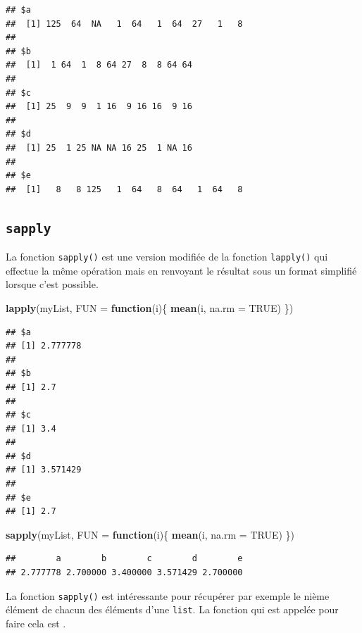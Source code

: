 \documentclass[]{book}
\newenvironment{Shaded}{\begin{snugshade}}{\end{snugshade}}
\newcommand{\ControlFlowTok}[1]{\textcolor[rgb]{0.13,0.29,0.53}{\textbf{#1}}}
\newcommand{\DataTypeTok}[1]{\textcolor[rgb]{0.13,0.29,0.53}{#1}}
\newcommand{\KeywordTok}[1]{\textcolor[rgb]{0.13,0.29,0.53}{\textbf{#1}}}
\newcommand{\NormalTok}[1]{#1}
\newcommand{\OtherTok}[1]{\textcolor[rgb]{0.56,0.35,0.01}{#1}}
\begin{document}
\begin{verbatim}
## $a
##  [1] 125  64  NA   1  64   1  64  27   1   8
## 
## $b
##  [1]  1 64  1  8 64 27  8  8 64 64
## 
## $c
##  [1] 25  9  9  1 16  9 16 16  9 16
## 
## $d
##  [1] 25  1 25 NA NA 16 25  1 NA 16
## 
## $e
##  [1]   8   8 125   1  64   8  64   1  64   8
\end{verbatim}

\hypertarget{l17lapply}{%
\subsection{\texorpdfstring{\texttt{sapply}}{sapply}}\label{l17lapply}}

La fonction \texttt{sapply()} est une version modifiée de la fonction \texttt{lapply()} qui effectue la même opération mais en renvoyant le résultat sous un format simplifié lorsque c'est possible.

\begin{Shaded}
\begin{Highlighting}[]
\KeywordTok{lapply}\NormalTok{(myList, }\DataTypeTok{FUN =} \ControlFlowTok{function}\NormalTok{(i)\{}
  \KeywordTok{mean}\NormalTok{(i, }\DataTypeTok{na.rm =} \OtherTok{TRUE}\NormalTok{)}
\NormalTok{\})}
\end{Highlighting}
\end{Shaded}

\begin{verbatim}
## $a
## [1] 2.777778
## 
## $b
## [1] 2.7
## 
## $c
## [1] 3.4
## 
## $d
## [1] 3.571429
## 
## $e
## [1] 2.7
\end{verbatim}

\begin{Shaded}
\begin{Highlighting}[]
\KeywordTok{sapply}\NormalTok{(myList, }\DataTypeTok{FUN =} \ControlFlowTok{function}\NormalTok{(i)\{}
  \KeywordTok{mean}\NormalTok{(i, }\DataTypeTok{na.rm =} \OtherTok{TRUE}\NormalTok{)}
\NormalTok{\})}
\end{Highlighting}
\end{Shaded}

\begin{verbatim}
##        a        b        c        d        e 
## 2.777778 2.700000 3.400000 3.571429 2.700000
\end{verbatim}

La fonction \texttt{sapply()} est intéressante pour récupérer par exemple le nième élément de chacun des éléments d'une \texttt{list}. La fonction qui est appelée pour faire cela est \texttt{\textquotesingle{}{[}{[}\textquotesingle{}}.
\end{document}
